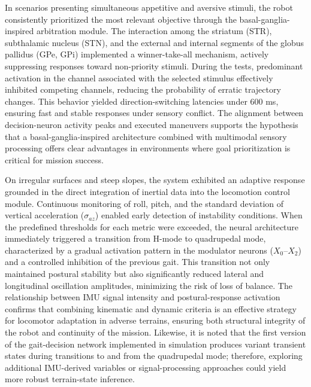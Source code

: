 \documentclass[preprint,12pt]{elsarticle}
\begin{document}
In scenarios presenting simultaneous appetitive and aversive stimuli, the robot consistently prioritized the most relevant objective through the basal-ganglia-inspired arbitration module. The interaction among the striatum (STR), subthalamic nucleus (STN), and the external and internal segments of the globus pallidus (GPe, GPi) implemented a winner-take-all mechanism, actively suppressing responses toward non-priority stimuli. During the tests, predominant activation in the channel associated with the selected stimulus effectively inhibited competing channels, reducing the probability of erratic trajectory changes. This behavior yielded direction-switching latencies under 600 ms, ensuring fast and stable responses under sensory conflict. The alignment between decision-neuron activity peaks and executed maneuvers supports the hypothesis that a basal-ganglia-inspired architecture combined with multimodal sensory processing offers clear advantages in environments where goal prioritization is critical for mission success. 

On irregular surfaces and steep slopes, the system exhibited an adaptive response grounded in the direct integration of inertial data into the locomotion control module. Continuous monitoring of roll, pitch, and the standard deviation of vertical acceleration ($\sigma_{az}$) enabled early detection of instability conditions. When the predefined thresholds for each metric were exceeded, the neural architecture immediately triggered a transition from H-mode to quadrupedal mode, characterized by a gradual activation pattern in the modulator neurons ($X_{0}$–$X_{2}$) and a controlled inhibition of the previous gait. This transition not only maintained postural stability but also significantly reduced lateral and longitudinal oscillation amplitudes, minimizing the risk of loss of balance. The relationship between IMU signal intensity and postural-response activation confirms that combining kinematic and dynamic criteria is an effective strategy for locomotor adaptation in adverse terrains, ensuring both structural integrity of the robot and continuity of the mission. Likewise, it is noted that the first version of the gait-decision network implemented in simulation produces variant transient states during transitions to and from the quadrupedal mode; therefore, exploring additional IMU-derived variables or signal-processing approaches could yield more robust terrain-state inference. 
\end{document}
